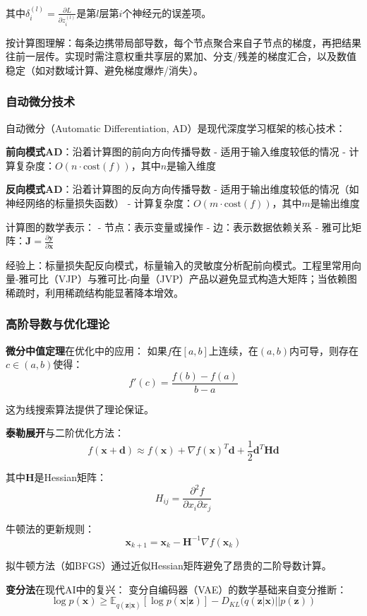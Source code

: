 其中$\delta_i^{(l)} = \frac{\partial L}{\partial z_i^{(l)}}$是第$l$层第$i$个神经元的误差项。

按计算图理解：每条边携带局部导数，每个节点聚合来自子节点的梯度，再把结果往前一层传。实现时需注意权重共享层的累加、分支/残差的梯度汇合，以及数值稳定（如对数域计算、避免梯度爆炸/消失）。

\subsubsection{自动微分技术}

自动微分（Automatic Differentiation, AD）是现代深度学习框架的核心技术：

\textbf{前向模式AD}：沿着计算图的前向方向传播导数
- 适用于输入维度较低的情况
- 计算复杂度：$O(n \cdot \text{cost}(f))$，其中$n$是输入维度

\textbf{反向模式AD}：沿着计算图的反向方向传播导数
- 适用于输出维度较低的情况（如神经网络的标量损失函数）
- 计算复杂度：$O(m \cdot \text{cost}(f))$，其中$m$是输出维度

计算图的数学表示：
- 节点：表示变量或操作
- 边：表示数据依赖关系
- 雅可比矩阵：$\mathbf{J} = \frac{\partial \mathbf{y}}{\partial \mathbf{x}}$

经验上：标量损失配反向模式，标量输入的灵敏度分析配前向模式。工程里常用向量-雅可比（VJP）与雅可比-向量（JVP）产品以避免显式构造大矩阵；当依赖图稀疏时，利用稀疏结构能显著降本增效。

\subsubsection{高阶导数与优化理论}

\textbf{微分中值定理}在优化中的应用：
如果$f$在$[a,b]$上连续，在$(a,b)$内可导，则存在$c \in (a,b)$使得：
$$f'(c) = \frac{f(b) - f(a)}{b - a}$$

这为线搜索算法提供了理论保证。

\textbf{泰勒展开}与二阶优化方法：
$$f(\mathbf{x} + \mathbf{d}) \approx f(\mathbf{x}) + \nabla f(\mathbf{x})^T \mathbf{d} + \frac{1}{2}\mathbf{d}^T \mathbf{H} \mathbf{d}$$

其中$\mathbf{H}$是Hessian矩阵：
$$H_{ij} = \frac{\partial^2 f}{\partial x_i \partial x_j}$$

牛顿法的更新规则：
$$\mathbf{x}_{k+1} = \mathbf{x}_k - \mathbf{H}^{-1} \nabla f(\mathbf{x}_k)$$

拟牛顿方法（如BFGS）通过近似Hessian矩阵避免了昂贵的二阶导数计算。

\textbf{变分法}在现代AI中的复兴：
变分自编码器（VAE）的数学基础来自变分推断：
$$\log p(\mathbf{x}) \geq \mathbb{E}_{q(\mathbf{z}|\mathbf{x})}[\log p(\mathbf{x}|\mathbf{z})] - D_{KL}(q(\mathbf{z}|\mathbf{x})||p(\mathbf{z}))$$

